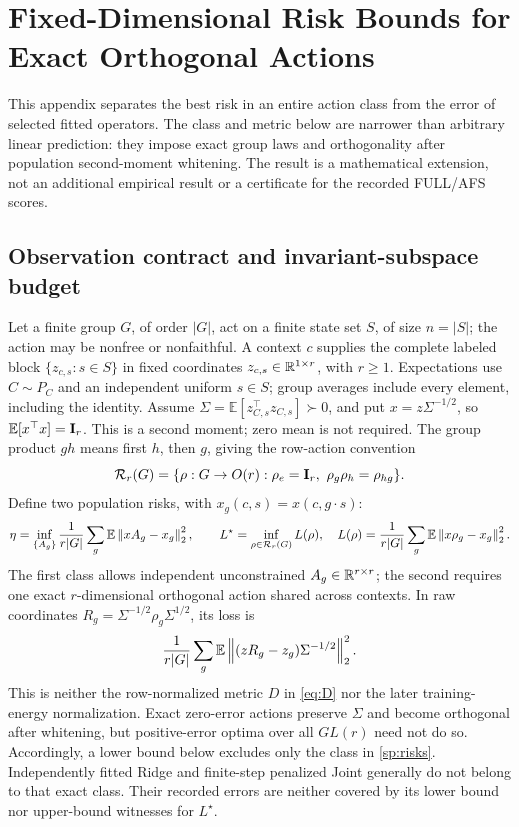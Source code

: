 \section{Fixed-Dimensional Risk Bounds for Exact Orthogonal Actions}
\label{app:spectral-risk}

This appendix separates the best risk in an entire action class from the error of selected fitted operators. The class and metric below are narrower than arbitrary linear prediction: they impose exact group laws and orthogonality after population second-moment whitening. The result is a mathematical extension, not an additional empirical result or a certificate for the recorded FULL/AFS scores.

\subsection{Observation contract and invariant-subspace budget}
\label{sp:setup}
Let a finite group $G$, of order $|G|$, act on a finite state set $S$, of size $n=|S|$; the action may be nonfree or nonfaithful. A context $c$ supplies the complete labeled block $\{z_{c,s}:s\in S\}$ in fixed coordinates $z_{c,s}\in\mathbb{R}^{1\times r}$, with $r\ge1$. Expectations use $C\sim P_C$ and an independent uniform $s\in S$; group averages include every element, including the identity. Assume $\Sigma=\mathbb E[z_{C,s}^{\top}z_{C,s}]\succ0$, and put $x=z\Sigma^{-1/2}$, so $\mathbb E[x^{\top}x]=\mathbf{I}_r$. This is a second moment; zero mean is not required. The group product $gh$ means first $h$, then $g$, giving the row-action convention
\[
 \mathcal R_r(G)=\{\rho:G\to O(r):\rho_e=\Id_r,\ \rho_g\rho_h=\rho_{hg}\}.
\]
Define two population risks, with $x_g(c,s)=x(c,g\cdot s)$:
\begin{equation}
 \eta=\inf_{\{A_g\}}\frac1{r|G|}\sum_g\mathbb E\left\lVert xA_g-x_g\right\rVert_2^2,
 \qquad L^\star=\inf_{\rho\in\mathcal R_r(G)}L(\rho),\quad
 L(\rho)=\frac1{r|G|}\sum_g\mathbb E\left\lVert x\rho_g-x_g\right\rVert_2^2.
 \label{sp:risks}
\end{equation}
The first class allows independent unconstrained $A_g\in\mathbb{R}^{r\times r}$; the second requires one exact $r$-dimensional orthogonal action shared across contexts. In raw coordinates $R_g=\Sigma^{-1/2}\rho_g\Sigma^{1/2}$, its loss is
\[
 \frac1{r|G|}\sum_g\mathbb E\left\lVert (zR_g-z_g)\Sigma^{-1/2}\right\rVert_2^2.
\]
This is neither the row-normalized metric $D$ in \cref{eq:D} nor the later training-energy normalization. Exact zero-error actions preserve $\Sigma$ and become orthogonal after whitening, but positive-error optima over all $GL(r)$ need not do so. Accordingly, a lower bound below excludes only the class in \cref{sp:risks}. Independently fitted Ridge and finite-step penalized Joint generally do not belong to that exact class. Their recorded errors are neither covered by its lower bound nor upper-bound witnesses for $L^\star$.

